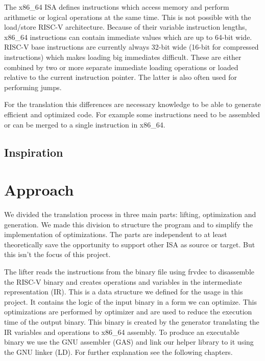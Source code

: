 \documentclass[course=eragp]{aspdoc}
\begin{document}
\par

The x86\_64 ISA defines instructions which access memory and perform arithmetic or logical
operations at the same time. This is not possible with the load/store RISC-V architecture. Because
of their variable instruction lengths, x86\_64 instructions can contain immediate values which are
up to 64-bit wide.\cite[Vol.~2B~p.~4-35]{intel2017man} RISC-V base instructions are currently always
32-bit wide (16-bit for compressed instructions)\cite[p.~8]{rvspec} which makes loading big
immediates difficult. These are either combined by two or more separate immediate loading operations
or loaded relative to the current instruction pointer.\cite[p.~19]{rvspec} The latter is also often
used for performing jumps.\cite [p.~20]{rvspec}

\par

For the translation this differences are necessary knowledge to be able to generate efficient and optimized code.
For example some instructions need to be assembled or can be merged to a single instruction in x86\_64.

\subsection{Inspiration}

\section{Approach}

We divided the translation process in three main parts: lifting, optimization and generation. We
made this division to structure the program and to simplify the implementation of optimizations.
The parts are independent to at least theoretically save the opportunity to support other ISA as
source or target. But this isn't the focus of this project.

\par

The lifter reads the instructions from the binary file using frvdec\cite{frvdec} to disassemble the
RISC-V binary and creates operations and variables in the intermediate representation (IR). This is
a data structure we defined for the usage in this project. It contains the logic of the input binary
in a form we can optimize. This optimizations are performed by optimizer and are used to reduce the
execution time of the output binary. This binary is created by the generator translating the IR
variables and operations to x86\_64 assembly. To produce an executable binary we use the GNU
assembler (GAS)\cite{gnu_binutils} and link our helper library to it using the GNU linker
(LD)\cite{gnu_binutils}. For further explanation see the following chapters.
\end{document}
